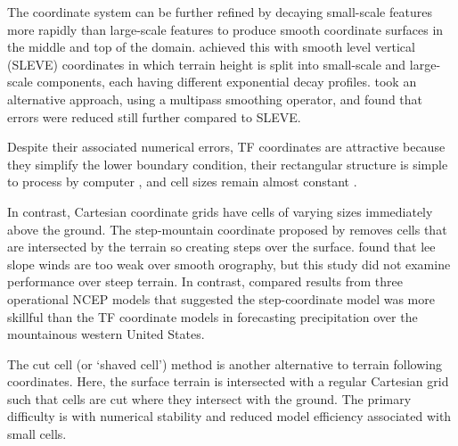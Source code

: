 The coordinate system can be further refined by decaying small-scale features more rapidly than large-scale features to produce smooth coordinate surfaces in the middle and top of the domain.  \textcite{schaer2002} achieved this with smooth level vertical (SLEVE) coordinates in which terrain height is split into small-scale and large-scale components, each having different exponential decay profiles.    \textcite{klemp2011} took an alternative approach, using a multipass smoothing operator, and found that errors were reduced still further compared to SLEVE.


Despite their associated numerical errors, TF coordinates are attractive because they simplify the lower boundary condition, their rectangular structure is simple to process by computer \autocite{schaer2002}, and cell sizes remain almost constant \autocite{jebens2011}.

In contrast, Cartesian coordinate grids have cells of varying sizes immediately above the ground.  The step-mountain coordinate proposed by \textcite{mesinger1988} removes cells that are intersected by the terrain so creating steps over the surface.    \textcite{gallus-klemp2000} found that lee slope winds are too weak over smooth orography, but this study did not examine performance over steep terrain.  In contrast, \textcite{mesinger2004} compared results from three operational NCEP models that suggested the step-coordinate model was more skillful than the TF coordinate models in forecasting precipitation over the mountainous western United States.


The cut cell (or `shaved cell')  method is another alternative to terrain following coordinates.  Here, the surface terrain is intersected with a regular Cartesian grid such that cells are cut where they intersect with the ground.   The primary difficulty is with numerical stability and reduced model efficiency associated with small cells. 

